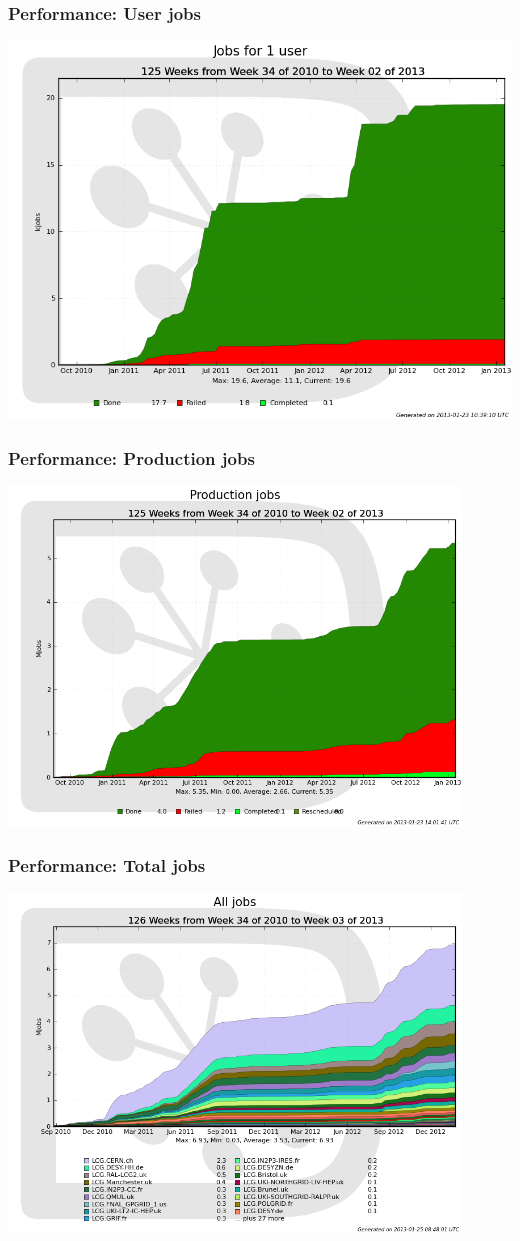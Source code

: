\documentclass[10pt,table,dvipsnames]{beamer}
\begin{document}
\begin{frame}
  \frametitle{Performance: User jobs}
\centering
\includegraphics[width=.9\textwidth]{JobsJJ}\\
\end{frame}
\begin{frame}
  \frametitle{Performance: Production jobs}
\centering
\includegraphics[width=0.9\textwidth]{JobsProd}\\
\end{frame}

\begin{frame}
  \frametitle{Performance: Total jobs}
\centering
\includegraphics[width=0.9\textwidth]{JobsAll}\\
\end{frame}
\end{document}
